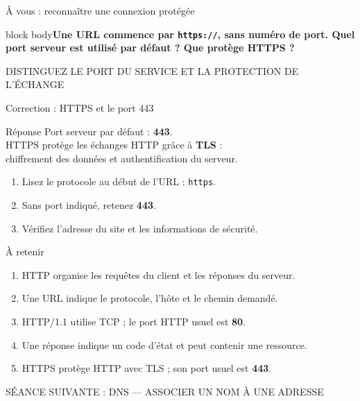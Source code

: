 \documentclass[aspectratio=169,11pt]{beamer}
\newcommand{\question}[1]{\begin{beamercolorbox}[rounded=true,sep=12pt]{block body}\Large\textbf{#1}\end{beamercolorbox}}
\newcommand{\etiquette}[1]{{\color{or}\small\MakeUppercase{#1}}}
\begin{document}
\begin{frame}{À vous : reconnaître une connexion protégée}
  \question{Une URL commence par \texttt{https://}, sans numéro de port.
    Quel port serveur est utilisé par défaut ? Que protège HTTPS ?}
  \bigskip
  \etiquette{Distinguez le port du service et la protection de l'échange}
\end{frame}

\begin{frame}{Correction : HTTPS et le port 443}
  \begin{block}{Réponse}
    Port serveur par défaut : \textbf{443}.\\
    HTTPS protège les échanges HTTP grâce à \textbf{TLS} :\\
    chiffrement des données et authentification du serveur.
  \end{block}
  \begin{enumerate}
    \item Lisez le protocole au début de l'URL : \texttt{https}.
    \item Sans port indiqué, retenez \textbf{443}.
    \item Vérifiez l'adresse du site et les informations de sécurité.
  \end{enumerate}
\end{frame}

\begin{frame}{À retenir}
  \begin{enumerate}
    \item HTTP organise les requêtes du client et les réponses du serveur.
    \item Une URL indique le protocole, l'hôte et le chemin demandé.
    \item HTTP/1.1 utilise TCP ; le port HTTP usuel est \textbf{80}.
    \item Une réponse indique un code d'état et peut contenir une ressource.
    \item HTTPS protège HTTP avec TLS ; son port usuel est \textbf{443}.
  \end{enumerate}
  \bigskip
  \etiquette{Séance suivante : DNS — associer un nom à une adresse}
\end{frame}
\end{document}
